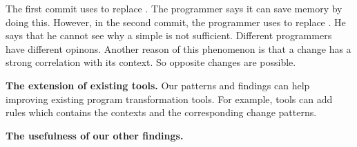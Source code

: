 The first commit uses  to replace . The programmer says it can save memory by doing this. However, in the second commit, the programmer uses  to replace . He says that he cannot see why a simple  is not sufficient. Different programmers have different opinons. Another reason of this phenomenon is that a change has a strong correlation with its context. So opposite changes are possible.

\noindent
\textbf{The extension of existing tools.} Our patterns and findings can help improving existing program transformation tools. For example, tools can add rules which contains the contexts and the corresponding change patterns.

\noindent
\textbf{The usefulness of our other findings.} 
